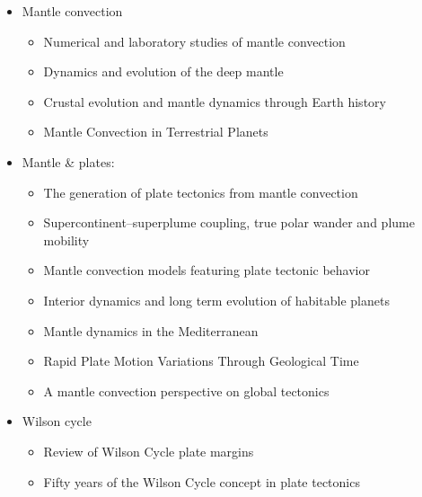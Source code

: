 \begin{itemize}
\item Mantle convection 

   \begin{itemize}
   \item [\twothousandfive] Numerical and laboratory studies of mantle convection \cite{taxn05}
   \item [\twothousandtwelve] Dynamics and evolution of the deep mantle  \cite{tack12}
   \item [\twothousandeighteen] Crustal evolution and mantle dynamics through Earth history \cite{kore18}
   \item [\twothousandtwenty] Mantle Convection in Terrestrial Planets \cite{mube20}
   \end{itemize}

\item Mantle \& plates:
   \begin{itemize}
   \item [\twothousandthree] The generation of plate tectonics from mantle convection \cite{berc03}
   \item [\twothousandnine] Supercontinent–superplume coupling, true polar wander and plume mobility \cite{lizh09}
   \item [\twothousandeleven] Mantle convection models featuring plate tectonic behavior \cite{lowm11}
   \item [\twothousandtwelve] Interior dynamics and long term evolution of habitable planets \cite{taab12}
   \item [\twothousandfourteen] Mantle dynamics in the Mediterranean \cite{faba14}
   \item [\twothousandfifteen] Rapid Plate Motion Variations Through Geological Time \cite{iabu15}
   \item [\twothousandseventeen] A mantle convection perspective on global tectonics \cite{cogu17}
   \end{itemize}

\item Wilson cycle
   \begin{itemize}
   \item [\twothousandfourteen] Review of Wilson Cycle plate margins \cite{buto14}
   \item [\twothousandnineteen] Fifty years of the Wilson Cycle concept in plate tectonics \cite{wihb19}
   \end{itemize}


\end{itemize}
